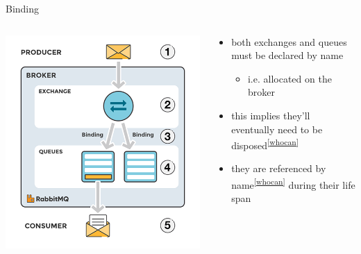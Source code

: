\documentclass{beamer}\mode<presentation>{\usetheme{AMSBolognaFC}}
\begin{document}
\begin{frame}{Binding}

    \begin{columns}
        \begin{column}{.5\linewidth}
            \includegraphics[width=\linewidth]{img/binding.png}
        \end{column}
        \begin{column}{.5\linewidth}
            \begin{itemize}
                \item both exchanges and queues must be \alert{declared by name}\footnotemark
                \begin{itemize}
                    \item i.e. \alert{allocated} on the broker
                \end{itemize}

                \medskip

                \item this implies they'll eventually need to be \alert{disposed}\textsuperscript{\ref{whocan}}

                \medskip

                \item they are \alert{referenced by name}\textsuperscript{\ref{whocan}} during their life span


\end{itemize}
\end{column}
\end{columns}
\end{frame}
\end{document}
